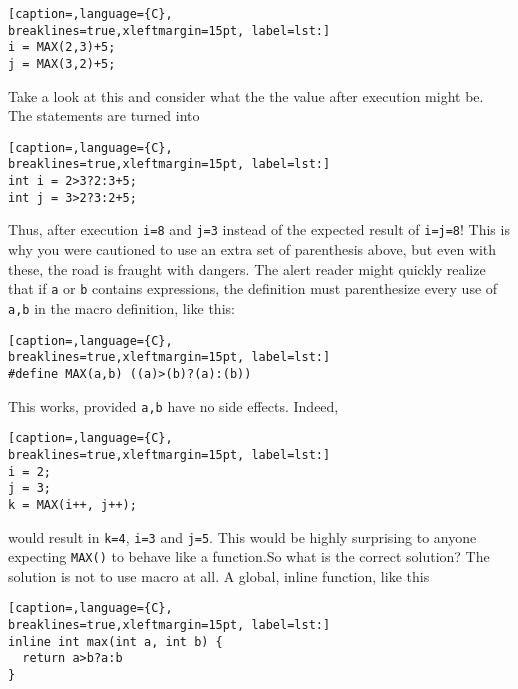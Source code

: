 \lstset{basicstyle=\scriptsize, numbers=left, captionpos=b, tabsize=4}
\begin{lstlisting}[caption=,language={C},
breaklines=true,xleftmargin=15pt, label=lst:]
i = MAX(2,3)+5;
j = MAX(3,2)+5;
\end{lstlisting}

Take a look at this and consider what the the value after execution might be.
The statements are turned into
\lstset{basicstyle=\scriptsize, numbers=left, captionpos=b, tabsize=4}
\begin{lstlisting}[caption=,language={C},
breaklines=true,xleftmargin=15pt, label=lst:]
int i = 2>3?2:3+5;
int j = 3>2?3:2+5;
\end{lstlisting}

Thus, after execution \texttt{i=8} and \texttt{j=3} instead of the expected
result of \texttt{i=j=8}! This is why you were cautioned to use an extra set of
parenthesis above, but even with these, the road is fraught with dangers. The
alert reader might quickly realize that if \texttt{a} or \texttt{b} contains
expressions, the definition must parenthesize every use of \texttt{a,b} in the
macro definition, like this:
\lstset{basicstyle=\scriptsize, numbers=left, captionpos=b, tabsize=4}
\begin{lstlisting}[caption=,language={C},
breaklines=true,xleftmargin=15pt, label=lst:]
#define MAX(a,b) ((a)>(b)?(a):(b))
\end{lstlisting}

This works, provided \texttt{a,b} have no side effects. Indeed, 
\lstset{basicstyle=\scriptsize, numbers=left, captionpos=b, tabsize=4}
\begin{lstlisting}[caption=,language={C},
breaklines=true,xleftmargin=15pt, label=lst:]
i = 2;
j = 3;
k = MAX(i++, j++);
\end{lstlisting}

would result in \texttt{k=4}, \texttt{i=3} and \texttt{j=5}. This would be
highly surprising to anyone expecting \texttt{MAX()} to behave like a
function.So what is the correct solution? The solution is not to use macro at
all. A global, inline function, like this
\lstset{basicstyle=\scriptsize, numbers=left, captionpos=b, tabsize=4}
\begin{lstlisting}[caption=,language={C},
breaklines=true,xleftmargin=15pt, label=lst:]
inline int max(int a, int b) { 
  return a>b?a:b 
}
\end{lstlisting}

